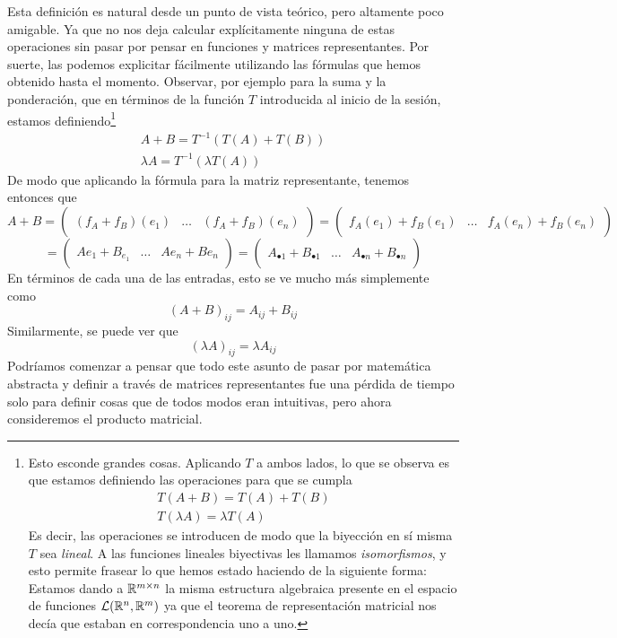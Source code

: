 Esta definición es natural desde un punto de vista teórico, pero altamente poco amigable. Ya que no nos deja calcular explícitamente ninguna de estas operaciones sin pasar por pensar en funciones y matrices representantes. Por suerte, las podemos explicitar fácilmente utilizando las fórmulas que hemos obtenido hasta el momento. Observar, por ejemplo para la suma y la ponderación, que en términos de la función $T$ introducida al inicio de la sesión, estamos definiendo\footnote{Esto esconde grandes cosas. Aplicando $T$ a ambos lados, lo que se observa es que estamos definiendo las operaciones para que se cumpla
\begin{align*}
    T(A + B) = T(A) + T(B) \\
    T(\lambda A) = \lambda T(A)
\end{align*}
Es decir, las operaciones se introducen de modo que la biyección en sí misma $T$ sea \textit{lineal}. A las funciones lineales biyectivas les llamamos \textit{isomorfismos}, y esto permite frasear lo que hemos estado haciendo de la siguiente forma: Estamos dando a $\mathbb{R}^{m \times n}$ la misma estructura algebraica presente en el espacio de funciones $\mathcal{L}(\mathbb{R}^n, \mathbb{R}^m)$ ya que el teorema de representación matricial nos decía que estaban en correspondencia uno a uno.
}
\begin{align*}
    A + B = T^{-1}(T(A) + T(B)) \\
    \lambda A = T^{-1}(\lambda T(A))
\end{align*}
De modo que aplicando la fórmula para la matriz representante, tenemos entonces que
\[A + B = \begin{pmatrix} & & \\ (f_A + f_B)(e_1) & \dots & (f_A + f_B)(e_n) \\ & & \end{pmatrix} = \begin{pmatrix} & & \\ f_A(e_1) + f_B(e_1) & \dots & f_A(e_n) + f_B(e_n) \\ & & \end{pmatrix}\]
\[= \begin{pmatrix} & & \\ A e_1 + B_{e_1} & \dots & A e_n + B e_n \\ & & \end{pmatrix} = \begin{pmatrix} & & \\ A_{\bullet 1} + B_{\bullet 1} & \dots & A_{\bullet n} + B_{\bullet n} \\ & & \end{pmatrix}\]
En términos de cada una de las entradas, esto se ve mucho más simplemente como
\[(A + B)_{ij} = A_{ij} + B_{ij}\]
Similarmente, se puede ver que
\[(\lambda A)_{ij} = \lambda A_{ij}\]
Podríamos comenzar a pensar que todo este asunto de pasar por matemática abstracta y definir a través de matrices representantes fue una pérdida de tiempo solo para definir cosas que de todos modos eran intuitivas, pero ahora consideremos el producto matricial.


